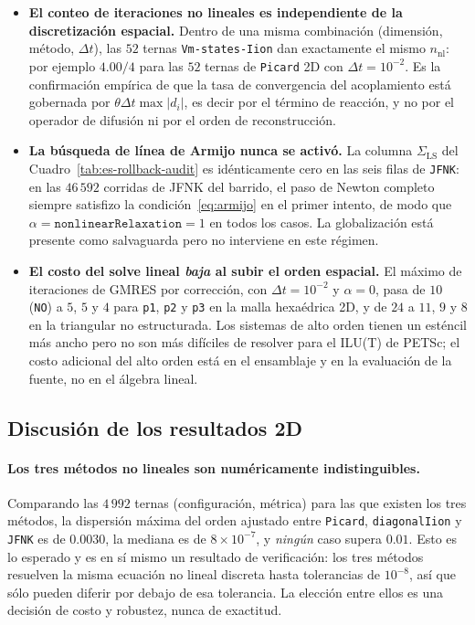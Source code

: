 \documentclass[11pt,a4paper]{article}
\newcommand{\code}[1]{\texttt{\small #1}}
\begin{document}
\begin{itemize}
\item \textbf{El conteo de iteraciones no lineales es independiente de la discretización
espacial.} Dentro de una misma combinación (dimensión, método, $\Delta t$), las $52$ ternas
\code{Vm-states-Iion} dan exactamente el mismo $n_{\mathrm{nl}}$: por ejemplo $4.00/4$ para
las $52$ ternas de \code{Picard} 2D con $\Delta t=10^{-2}$. Es la confirmación empírica de que
la tasa de convergencia del acoplamiento está gobernada por $\theta\Delta t\max|d_i|$, es
decir por el término de reacción, y no por el operador de difusión ni por el orden de
reconstrucción.

\item \textbf{La búsqueda de línea de Armijo nunca se activó.} La columna
$\Sigma_{\mathrm{LS}}$ del Cuadro~\ref{tab:es-rollback-audit} es idénticamente cero en
las seis filas de \code{JFNK}: en las $46\,592$ corridas de JFNK del barrido, el paso de
Newton completo siempre satisfizo la condición~\eqref{eq:armijo} en el primer intento, de modo
que $\alpha=\texttt{nonlinearRelaxation}=1$ en todos los casos. La globalización está presente
como salvaguarda pero no interviene en este régimen.

\item \textbf{El costo del solve lineal \emph{baja} al subir el orden espacial.} El máximo de
iteraciones de GMRES por corrección, con $\Delta t=10^{-2}$ y $\alpha=0$, pasa de $10$
(\code{NO}) a $5$, $5$ y $4$ para \code{p1}, \code{p2} y \code{p3} en la malla hexaédrica 2D,
y de $24$ a $11$, $9$ y $8$ en la triangular no estructurada. Los sistemas de alto orden
tienen un esténcil más ancho pero no son más difíciles de resolver para el ILU(T) de PETSc; el
costo adicional del alto orden está en el ensamblaje y en la evaluación de la fuente, no en el
álgebra lineal.
\end{itemize}



\FloatBarrier

\subsection{Discusión de los resultados 2D}
\label{sec:es-conclusiones-2d}

\paragraph{Los tres métodos no lineales son numéricamente indistinguibles.}
Comparando las $4\,992$ ternas (configuración, métrica) para las que existen los tres métodos,
la dispersión máxima del orden ajustado entre \code{Picard}, \code{diagonalIion} y \code{JFNK}
es de $0.0030$, la mediana es de $8\times10^{-7}$, y \emph{ningún} caso supera $0.01$. Esto es
lo esperado y es en sí mismo un resultado de verificación: los tres métodos resuelven la misma
ecuación no lineal discreta hasta tolerancias de $10^{-8}$, así que sólo pueden diferir por
debajo de esa tolerancia. La elección entre ellos es una decisión de costo y robustez, nunca
de exactitud.
\end{document}
